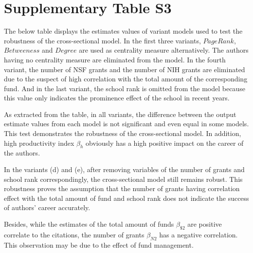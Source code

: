 \documentclass[10pt]{article}          %
\begin{document}
\newpage
\section{Supplementary Table S3}
\hspace{0.5cm}The below table displays the estimates values of variant models used to test the robustness of the cross-sectional model. In the first three variants, $Page Rank$, $Betweeness$ and $Degree$ are used as centrality measure alternatively. The authors having no centrality measure are eliminated from the model. In the fourth variant, the number of NSF grants and the number of NIH grants are eliminated due to the suspect of high correlation with the total amount of the corresponding fund. And in the last variant, the school rank is omitted from the model because this value only indicates the prominence effect of the school in recent years.

As extracted from the table, in all variants, the difference between the output estimate values from each model is not significant and even equal in some models. This test demonstrates the robustness of the cross-sectional model. In addition, high productivity index $\beta_h$ obviously has a high positive impact on the career of the authors.

In the variants (d) and (e), after removing variables of the number of grants and school rank correspondingly, the cross-sectional model still remains robust. This robustness proves the assumption that the number of grants having correlation effect with the total amount of fund and school rank does not indicate the success of authors' career accurately. 

Besides, while the estimates of the total amount of funds $\beta_{\$2}$ are positive correlate to the citations, the number of grants $\beta_{N2}$ has a negative correlation. This observation may be due to the effect of fund management.
\end{document}

